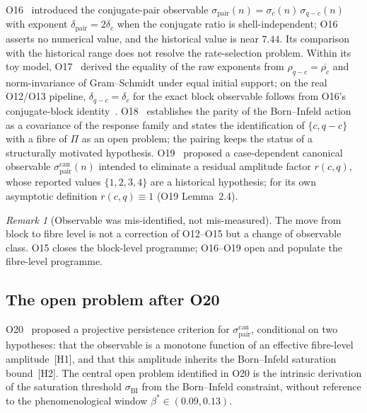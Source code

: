 \documentclass[11pt,a4paper]{article}
\theoremstyle{definition}
\theoremstyle{remark}
\newtheorem{remark}[theorem]{Remark}
\begin{document}
    O16~\cite{Beau2026a20} introduced the conjugate-pair observable
    $\sigma_{\mathrm{pair}}(n)=\sigma_c(n)\,\sigma_{q-c}(n)$
    with exponent $\delta_{\mathrm{pair}}=2\delta_c$ when the conjugate ratio is shell-independent;
    O16 asserts no numerical value, and the historical value is near $7.44$.
    Its comparison with the historical range does not resolve the rate-selection problem.
    Within its toy model, O17~\cite{Beau2026a21} derived the equality of the raw
    exponents from $\rho_{q-c} = \overline{\rho_c}$ and norm-invariance of
    Gram--Schmidt under equal initial support; on the real O12/O13 pipeline, $\delta_{q-c} = \delta_c$ for the exact
    block observable follows from O16's conjugate-block identity~\cite{Beau2026a20}.
    O18~\cite{Beau2026a22} establishes the parity of the Born--Infeld
    action as a covariance of the response family and states the identification of
    $\{c, q-c\}$ with a fibre of $\Pi$ as an open problem; the pairing
    keeps the status of a structurally motivated hypothesis.
    O19~\cite{Beau2026a23} proposed a case-dependent canonical observable
    $\sigma_{\mathrm{pair}}^{\mathrm{can}}(n)$ intended to eliminate a residual amplitude
    factor $r(c,q)$, whose reported values $\{1,2,3,4\}$ are a historical hypothesis; for its own
    asymptotic definition $r(c,q)\equiv1$ (O19 Lemma~2.4).

    \begin{remark}[Observable was mis-identified, not mis-measured]
      \label{rem:mis-identified-background}
      The move from block to fibre level is not a correction of
      O12--O15 but a change of observable class.
      O15 closes the block-level programme; O16--O19 open and
      populate the fibre-level programme.
    \end{remark}

  \subsection{The open problem after O20}

    O20~\cite{Beau2026a24} proposed a projective persistence
    criterion for $\sigma_{\mathrm{pair}}^{\mathrm{can}}$,
    conditional on two hypotheses:
    that the observable is a monotone function of an effective
    fibre-level amplitude~[H1], and that this amplitude inherits
    the Born--Infeld saturation bound~[H2].
    The central open problem identified in O20 is the intrinsic
    derivation of the saturation threshold $\sigma_{\mathrm{BI}}$
    from the Born--Infeld constraint, without reference to the
    phenomenological window $\beta^* \in (0.09, 0.13)$.
\end{document}
